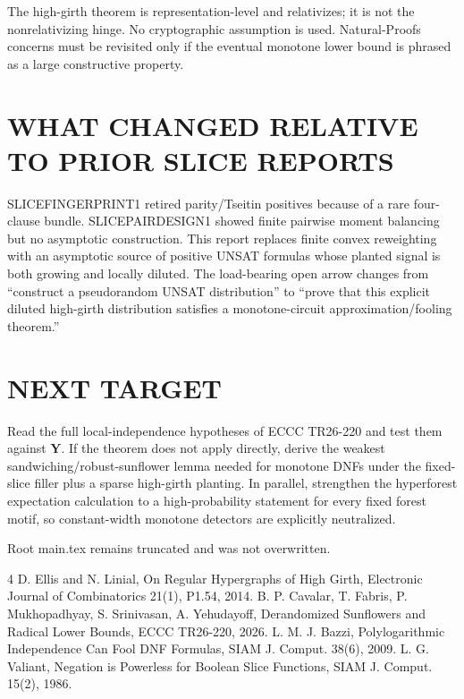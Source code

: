 \documentclass[11pt]{article}
\begin{document}
The high-girth theorem is representation-level and relativizes; it is not the nonrelativizing hinge. No cryptographic assumption is used. Natural-Proofs concerns must be revisited only if the eventual monotone lower bound is phrased as a large constructive property.

\section{WHAT CHANGED RELATIVE TO PRIOR SLICE REPORTS}
SLICEFINGERPRINT1 retired parity/Tseitin positives because of a rare four-clause bundle. SLICEPAIRDESIGN1 showed finite pairwise moment balancing but no asymptotic construction. This report replaces finite convex reweighting with an asymptotic source of positive UNSAT formulas whose planted signal is both growing and locally diluted. The load-bearing open arrow changes from ``construct a pseudorandom UNSAT distribution'' to ``prove that this explicit diluted high-girth distribution satisfies a monotone-circuit approximation/fooling theorem.''

\section{NEXT TARGET}
Read the full local-independence hypotheses of ECCC TR26-220 and test them against $\mathbf Y$. If the theorem does not apply directly, derive the weakest sandwiching/robust-sunflower lemma needed for monotone DNFs under the fixed-slice filler plus a sparse high-girth planting. In parallel, strengthen the hyperforest expectation calculation to a high-probability statement for every fixed forest motif, so constant-width monotone detectors are explicitly neutralized.

Root main.tex remains truncated and was not overwritten.

\begin{thebibliography}{4}
 D. Ellis and N. Linial, On Regular Hypergraphs of High Girth, Electronic Journal of Combinatorics 21(1), P1.54, 2014.
 B. P. Cavalar, T. Fabris, P. Mukhopadhyay, S. Srinivasan, A. Yehudayoff, Derandomized Sunflowers and Radical Lower Bounds, ECCC TR26-220, 2026.
 L. M. J. Bazzi, Polylogarithmic Independence Can Fool DNF Formulas, SIAM J. Comput. 38(6), 2009.
 L. G. Valiant, Negation is Powerless for Boolean Slice Functions, SIAM J. Comput. 15(2), 1986.
\end{thebibliography}
\end{document}
